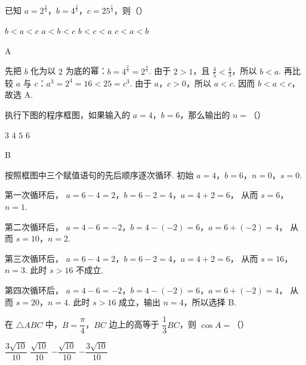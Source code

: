 \begin{problem}
已知 \(a=2^{\frac{4}{3}}\)，\(b=4^{\frac{2}{5}}\)，\(c=25^{\frac{1}{3}}\)，则（\quad）

\choices
    {\(b<a<c\)}
    {\(a<b<c\)}
    {\(b<c<a\)}
    {\(c<a<b\)}
\end{problem}

\begin{answer}
A
\end{answer}

\begin{solution}
先把 \(b\) 化为以 \(2\) 为底的幂：\(b=4^{\frac{2}{5}}=2^{\frac{4}{5}}\). 由于 \(2>1\)，且 \(\frac45<\frac43\)，所以 \(b<a\). 再比较 \(a\) 与 \(c\)：\(a^3=2^4=16<25=c^3\). 由于 \(a\)，\(c>0\)，所以 \(a<c\). 因而 \(b<a<c\)，故选 A.
\end{solution}

\begin{problem}
执行下图的程序框图，如果输入的 \(a=4\)，\(b=6\)，那么输出的 \(n=\)（\quad）

\begingroup
{}
\endgroup

\choices
    {\(3\)}
    {\(4\)}
    {\(5\)}
    {\(6\)}
\end{problem}

\begin{answer}
B
\end{answer}

\begin{solution}
按照框图中三个赋值语句的先后顺序逐次循环. 初始 \(a=4\)，\(b=6\)，\(n=0\)，\(s=0\).

第一次循环后，
\(a=6-4=2\)，\(b=6-2=4\)，\(a=4+2=6\)，
从而 \(s=6\)，\(n=1\).

第二次循环后，
\(a=4-6=-2\)，\(b=4-(-2)=6\)，\(a=6+(-2)=4\)，
从而 \(s=10\)，\(n=2\).

第三次循环后，
\(a=6-4=2\)，\(b=6-2=4\)，\(a=4+2=6\)，
从而 \(s=16\)，\(n=3\). 此时 \(s>16\) 不成立.

第四次循环后，
\(a=4-6=-2\)，\(b=4-(-2)=6\)，\(a=6+(-2)=4\)，
从而 \(s=20\)，\(n=4\). 此时 \(s>16\) 成立，输出 \(n=4\)，所以选择 B.
\end{solution}

\begin{problem}
在 \(\triangle ABC\) 中，\(B=\dfrac{\pi}{4}\)，\(BC\) 边上的高等于 \(\dfrac13BC\)，则 \(\cos A=\)（\quad）

\choices
    {\(\dfrac{3\sqrt{10}}{10}\)}
    {\(\dfrac{\sqrt{10}}{10}\)}
    {\(-\dfrac{\sqrt{10}}{10}\)}
    {\(-\dfrac{3\sqrt{10}}{10}\)}
\end{problem}

